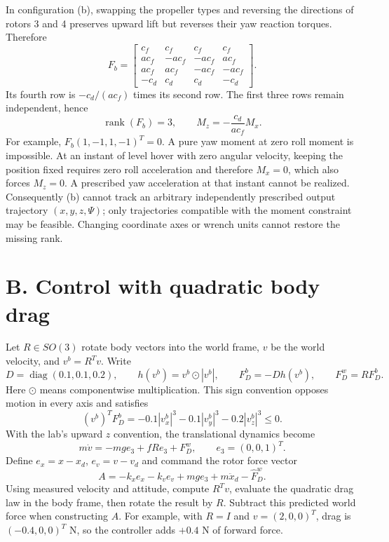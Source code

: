 \documentclass[11pt,a4paper]{article}
\begin{document}
In configuration (b), swapping the propeller types and reversing the
directions of rotors 3 and 4 preserves upward lift but reverses their
yaw reaction torques. Therefore
\begin{equation}
 F_b=\begin{bmatrix}
 c_f&c_f&c_f&c_f\\
 ac_f&-ac_f&-ac_f&ac_f\\
 ac_f&ac_f&-ac_f&-ac_f\\
 -c_d&c_d&c_d&-c_d
 \end{bmatrix}.
\end{equation}
Its fourth row is $-c_d/(ac_f)$ times its second row. The first three
rows remain independent, hence
\[
 \boxed{\operatorname{rank}(F_b)=3,\qquad
 M_z=-\frac{c_d}{ac_f}M_x.}
\]
For example, $F_b(1,-1,1,-1)^T=0$. A pure yaw moment at zero roll moment
is impossible. At an instant of level hover with zero angular velocity,
keeping the position fixed requires zero roll acceleration and therefore
$M_x=0$, which also forces $M_z=0$. A prescribed yaw acceleration at that
instant cannot be realized. Consequently (b) cannot track an arbitrary
independently prescribed output trajectory $(x,y,z,\Psi)$; only trajectories
compatible with the moment constraint may be feasible. Changing coordinate
axes or wrench units cannot restore the missing rank.

\section*{B. Control with quadratic body drag}
Let $R\in SO(3)$ rotate body vectors into the world frame, $v$ be the
world velocity, and $v^b=R^Tv$. Write
\[
 D=\operatorname{diag}(0.1,0.1,0.2),\qquad
 h(v^b)=v^b\odot|v^b|,\qquad
 F_D^b=-D h(v^b),\qquad F_D^w=RF_D^b.
\]
Here $\odot$ means componentwise multiplication. This sign convention
opposes motion in every axis and satisfies
\[
 (v^b)^TF_D^b=-0.1|v_x^b|^3-0.1|v_y^b|^3-0.2|v_z^b|^3\leq0.
\]
With the lab's upward $z$ convention, the translational dynamics become
\[
 m\dot v=-mg e_3+fRe_3+F_D^w,\qquad e_3=(0,0,1)^T.
\]
Define $e_x=x-x_d$, $e_v=v-v_d$ and command the rotor force vector
\begin{equation}
 \boxed{A=-k_xe_x-k_ve_v+mg e_3+m\ddot x_d-\widehat F_D^w.}
\end{equation}
Using measured velocity and attitude, compute $R^Tv$, evaluate the
quadratic drag law in the body frame, then rotate the result by $R$.
Subtract this predicted world force when constructing $A$. For example,
with $R=I$ and $v=(2,0,0)^T$, drag is $(-0.4,0,0)^T$ N, so the
controller adds $+0.4$ N of forward force.
\end{document}
